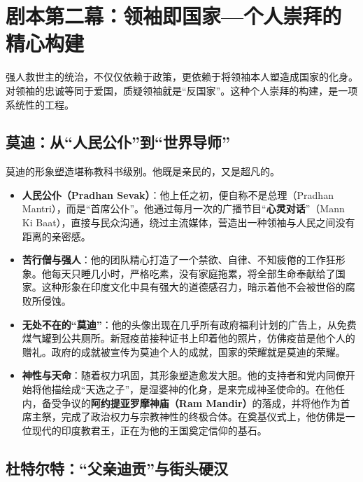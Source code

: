 \section{剧本第二幕：领袖即国家---个人崇拜的精心构建}
强人救世主的统治，不仅仅依赖于政策，更依赖于将领袖本人塑造成国家的化身。对领袖的忠诚等同于爱国，质疑领袖就是``反国家''。这种个人崇拜的构建，是一项系统性的工程。

\subsection{莫迪：从``人民公仆''到``世界导师''}

莫迪的形象塑造堪称教科书级别。他既是亲民的，又是超凡的。
\begin{itemize}
\item \textbf{人民公仆（Pradhan Sevak）}：他上任之初，便自称不是总理（Pradhan Mantri），而是``首席公仆''。他通过每月一次的广播节目``\textbf{心灵对话}''（Mann Ki Baat），直接与民众沟通，绕过主流媒体，营造出一种领袖与人民之间没有距离的亲密感。
\item \textbf{苦行僧与强人}：他的团队精心打造了一个禁欲、自律、不知疲倦的工作狂形象。他每天只睡几小时，严格吃素，没有家庭拖累，将全部生命奉献给了国家。这种形象在印度文化中具有强大的道德感召力，暗示着他不会被世俗的腐败所侵蚀。
\item \textbf{无处不在的``莫迪''}：他的头像出现在几乎所有政府福利计划的广告上，从免费煤气罐到公共厕所。新冠疫苗接种证书上印着他的照片，仿佛疫苗是他个人的赠礼。政府的成就被宣传为莫迪个人的成就，国家的荣耀就是莫迪的荣耀。
\item \textbf{神性与天命}：随着权力巩固，其形象塑造愈发大胆。他的支持者和党内同僚开始将他描绘成``天选之子''，是湿婆神的化身，是来完成神圣使命的。在他任内，备受争议的\textbf{阿约提亚罗摩神庙（Ram Mandir）}的落成，并将他作为首席主祭，完成了政治权力与宗教神性的终极合体。在奠基仪式上，他仿佛是一位现代的印度教君王，正在为他的王国奠定信仰的基石。
\end{itemize}
\subsection{杜特尔特：``父亲迪贡''与街头硬汉}

